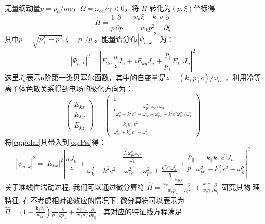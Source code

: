 无量纲动量$p=p_0/mc$，$Ω=ω_{ce}/γ<0$，将 $\hat{Π}$ 转化为$(p,ξ)$坐标得
\begin{equation}
\widehat{\Pi}=\frac{1}{p} \frac{\partial}{\partial p}-\frac{w_{k} \xi-k_{\|} v}{w_{k} p^{2}} \frac{\partial}{\partial \xi}
\end{equation}
其中$p=\sqrt{p_⊥^2+p_∥^2},ξ=p_{∥}/p$ 。能量谱分布$\left|\psi_{n,k}\right|^2$\cite{RN1757} 为：
\begin{equation}\label{eq:Psi}
\left|\Psi_{n, k}\right|^{2}=\left|E_{k x} \frac{n}{z} J_{n}+i E_{k y} J_{n}^{\prime}+\frac{p_{\mid}}{p_{\perp}} E_{k z} J_{n}\right|^{2}
\end{equation}
这里$J_n$表示n阶第一类贝塞尔函数，其中的自变量是$z=(k_⊥ p_⊥ c)/ω_{ce}$ ，利用冷等离子体色散关系得到电场的极化方向为：
\begin{equation}\label{eq:polar}
\begin{pmatrix}
 E_{kx}\\
  E_{ky}\\
E_{kz}
\end{pmatrix}=\begin{pmatrix}
 1\\
 i \frac{\omega_{p e}^{2} \omega_{c e} / \omega_{\mathrm{k}}}{\omega_{\mathrm{k}}^{2}-k^{2} c^{2}-\omega_{c e}^{2}-\omega_{p e}^{2}+k^{2} c^{2} \omega_{c e}^{2} / \omega_{\mathrm{k}}^{2}}\\
\frac{k_{\|} k_{\perp} c^{2}}{\omega_{p e}^{2}+k_{\perp}^{2} c^{2}-\omega_{\mathrm{k}}^{2}}
\end{pmatrix}
\end{equation}
将\autoref{eq:polar}其带入到\autoref{eq:Psi}得：
\begin{equation}
\left|\psi_{n, k}\right|^{2}=\left|E_{k x}\right|^{2}\left|\frac{n J_{n}}{z}+\frac{\frac{J_{n}^{\prime} \omega_{p e}^{2} \omega_{c e}}{\omega_{k}}}{\omega_{k}^{2}-k^{2} c^{2}-\omega_{c e}^{2}-\omega_{p e}^{2}+\frac{k^{2} c^{2} \omega_{c e}^{2}}{\omega_{k}^{2}}}+\frac{p_{\|}}{p_{\perp}} \frac{k_{\|} k_{\perp} c^{2} J_{n}}{\omega_{p e}^{2}+k_{\perp}^{2} c^{2}-\omega_{k}^{2}}\right|^{2}
\end{equation}
关于准线性湍动过程, 我们可以通过微分算符 $ \widehat{\Pi}=\frac{\omega_{k} -\frac{k_{\|} p_{\|}{c }}{\gamma}}{w_{k} p_{\perp}} \frac{\partial}{\partial p_{\perp}}+\frac{k_{\|} c}{w_{k} \gamma} \frac{\partial}{\partial p_{\|}}$ 研究其物 理特征, 在不考虑相对论效应的情况下, 微分算符可以表示为  $\widehat{\Pi}=(1-   \left.\frac{\mathrm{k}_{\|} v_{\|}}{w_{k r}}\right) \frac{1}{p_{\perp}} \frac{\partial}{\partial p_{\perp}}+\frac{k_{\|} v_{\perp}}{w_{k} p_{\perp}} \frac{\partial}{\partial p_{\|}}$ , 其对应的特征线方程满足
